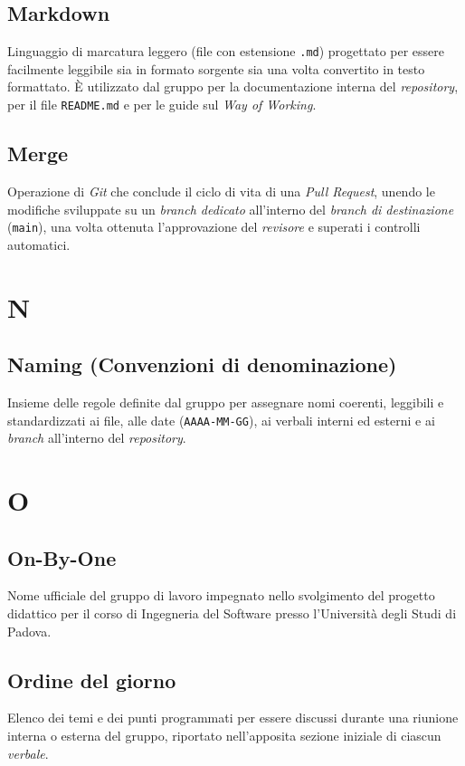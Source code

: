 \documentclass[11pt, a4paper]{article}
\begin{document}
\subsection*{Markdown}
Linguaggio di marcatura leggero (file con estensione \texttt{.md}) progettato per essere facilmente leggibile sia in formato sorgente sia una volta convertito in testo formattato. È utilizzato dal gruppo per la documentazione interna del \textit{repository}, per il file \texttt{README.md} e per le guide sul \textit{Way of Working}.

\subsection*{Merge}
Operazione di \textit{Git} che conclude il ciclo di vita di una \textit{Pull Request}, unendo le modifiche sviluppate su un \textit{branch dedicato} all'interno del \textit{branch di destinazione} (\texttt{main}), una volta ottenuta l'approvazione del \textit{revisore} e superati i controlli automatici.

\newpage

\section*{N}

\subsection*{Naming (Convenzioni di denominazione)}
Insieme delle regole definite dal gruppo per assegnare nomi coerenti, leggibili e standardizzati ai file, alle date (\texttt{AAAA-MM-GG}), ai verbali interni ed esterni e ai \textit{branch} all'interno del \textit{repository}.

\section*{O}

\subsection*{On-By-One}
Nome ufficiale del gruppo di lavoro impegnato nello svolgimento del progetto didattico per il corso di Ingegneria del Software presso l'Università degli Studi di Padova.

\subsection*{Ordine del giorno}
Elenco dei temi e dei punti programmati per essere discussi durante una riunione interna o esterna del gruppo, riportato nell'apposita sezione iniziale di ciascun \textit{verbale}.
\end{document}
